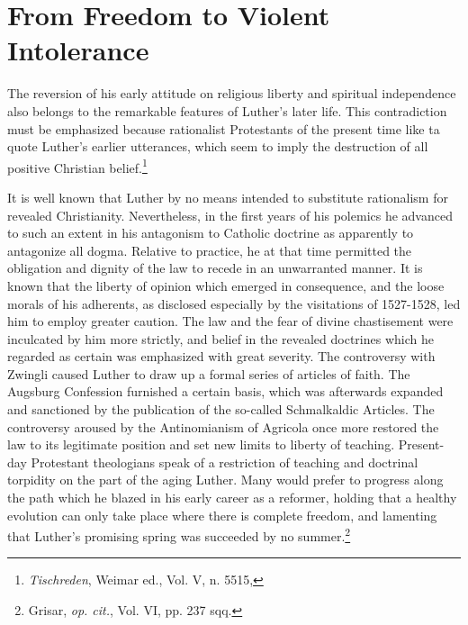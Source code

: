 \section{From Freedom to Violent Intolerance}

The reversion of his early attitude on religious liberty and spiritual
independence also belongs to the remarkable features of Luther’s later
life. This contradiction must be emphasized because rationalist Protestants
of the present time like ta quote Luther’s earlier utterances,
which seem to imply the destruction of all positive Christian belief.\footnote{\textit{Tischreden}, Weimar ed., Vol. V, n. 5515,}

It is well known that Luther by no means intended to substitute
rationalism for revealed Christianity. Nevertheless, in the first years of
his polemics he advanced to such an extent in his antagonism to Catholic
doctrine as apparently to antagonize all dogma. Relative to practice,
he at that time permitted the obligation and dignity of the law
to recede in an unwarranted manner. It is known that the liberty of
opinion which emerged in consequence, and the loose morals of his
adherents, as disclosed especially by the visitations of 1527-1528, led
him to employ greater caution. The law and the fear of divine
chastisement were inculcated by him more strictly, and belief in the
revealed doctrines which he regarded as certain was emphasized with
great severity. The controversy with Zwingli caused Luther to draw
up a formal series of articles of faith. The Augsburg Confession furnished
a certain basis, which was afterwards expanded and sanctioned
by the publication of the so-called Schmalkaldic Articles. The controversy
aroused by the Antinomianism of Agricola once more restored
the law to its legitimate position and set new limits to liberty
of teaching. Present-day Protestant theologians speak of a restriction
of teaching and doctrinal torpidity on the part of the aging Luther.
Many would prefer to progress along the path which he blazed in
his early career as a reformer, holding that a healthy evolution can
only take place where there is complete freedom, and lamenting that
Luther’s promising spring was succeeded by no summer.\footnote
{Grisar, \textit{op. cit.}, Vol. VI, pp. 237 sqq.}

